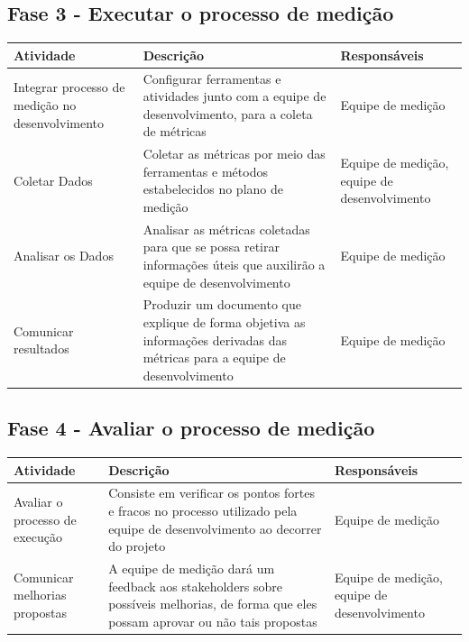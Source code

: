 \subsection{Fase 3 - Executar o processo de medição}

	\begin{tabular}{ |p{4cm}|p{6cm}| p{3cm} |}
	 \hline
	 Atividade 		& 		Descrição & Responsáveis \\
	 \hline
	 	Integrar processo de medição no desenvolvimento & Configurar ferramentas e atividades junto com a equipe de desenvolvimento, para a coleta de métricas &  Equipe de medição \\
	 \hline
	 	Coletar Dados & Coletar as métricas por meio das ferramentas e métodos estabelecidos no plano de medição  &  Equipe de medição, equipe de desenvolvimento \\
	 \hline
	 	Analisar os Dados & Analisar as métricas coletadas para que se possa retirar informações úteis que auxilirão a equipe de desenvolvimento &  Equipe de medição \\
	 \hline
	 	Comunicar resultados & Produzir um documento que explique de forma objetiva as informações derivadas das métricas para a equipe de desenvolvimento &  Equipe de medição \\
	 \hline
	\end{tabular}

\subsection{Fase 4 - Avaliar o processo de medição}

	\begin{tabular}{ |p{4cm}|p{6cm}| p{3cm} |}

	 \hline
	 Atividade 		& 		Descrição & Responsáveis \\
	 \hline
	 	Avaliar o processo de execução & Consiste em verificar os pontos fortes e fracos no processo utilizado pela equipe de desenvolvimento ao decorrer do projeto &  Equipe de medição \\
	 \hline
	 	Comunicar melhorias propostas & A equipe de medição dará um feedback aos stakeholders sobre possíveis melhorias, de forma que eles possam aprovar ou não tais propostas &  Equipe de medição, equipe de desenvolvimento \\
	 \hline

	\end{tabular}
